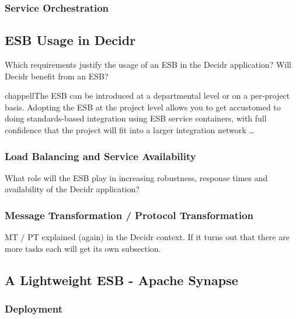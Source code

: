 \subsubsection{Service Orchestration}
\label{subsec:service-orchestration}



\subsection{ESB Usage in Decidr}
\label{subsec:esb-usage-in-decidr}
Which requirements justify the usage of an ESB in the Decidr application? 
Will Decidr benefit from an ESB?

\begin{mycite}{chappell}The ESB can be introduced at a departmental level or on
a per-project basis. Adopting the ESB at the project level
allows you to get accustomed to doing standards-based
integration using ESB service containers, with full confidence
that the project will fit into a larger integration network
\ldots
\end{mycite}

\subsubsection{Load Balancing and Service Availability}
\label{subsec:load-balancing-and-service-availability}
What role will the ESB play in increasing robustness, response times and
availability of the Decidr application?

\subsubsection{Message Transformation / Protocol Transformation}
\label{subsec:message-transformation-protocol-transformation}
MT / PT explained (again) in the Decidr context. If it turns out that there are
more tasks each will get its own subsection.

\subsection{A Lightweight ESB - Apache Synapse}
\label{sec:a-lightweight-esb-apache-synapse}
\subsubsection{Deployment}
\label{subsec:deployment}

